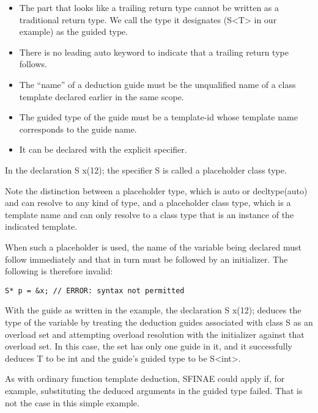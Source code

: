 \begin{itemize}
\item 
The part that looks like a trailing return type cannot be written as a traditional return type. We call the type it designates (S<T> in our example) as the guided type.

\item 
There is no leading auto keyword to indicate that a trailing return type follows.

\item 
The “name” of a deduction guide must be the unqualified name of a class template declared earlier in the same scope.

\item 
The guided type of the guide must be a template-id whose template name corresponds to the guide name.

\item 
It can be declared with the explicit specifier.
\end{itemize}	

In the declaration S x(12); the specifier S is called a placeholder class type.

\begin{tcolorbox}[colback=webgreen!5!white,colframe=webgreen!75!black]
\hspace*{0.75cm}Note the distinction between a placeholder type, which is auto or decltype(auto) and can resolve to any kind of type, and a placeholder class type, which is a template name and can only resolve to a class type that is an instance of the indicated template.
\end{tcolorbox}

When such a placeholder is used, the name of the variable being declared must follow immediately and that in turn must be followed by an initializer. The following is therefore invalid:
	
\begin{lstlisting}[style=styleCXX]
S* p = &x; // ERROR: syntax not permitted
\end{lstlisting}

With the guide as written in the example, the declaration S x(12); deduces the type of the variable by treating the deduction guides associated with class S as an overload set and attempting overload resolution with the initializer against that overload set. In this case, the set has only one guide in it, and it successfully deduces T to be int and the guide’s guided type to be S<int>.

\begin{tcolorbox}[colback=webgreen!5!white,colframe=webgreen!75!black]
\hspace*{0.75cm}As with ordinary function template deduction, SFINAE could apply if, for example, substituting the deduced arguments in the guided type failed. That is not the case in this simple example.
\end{tcolorbox}

